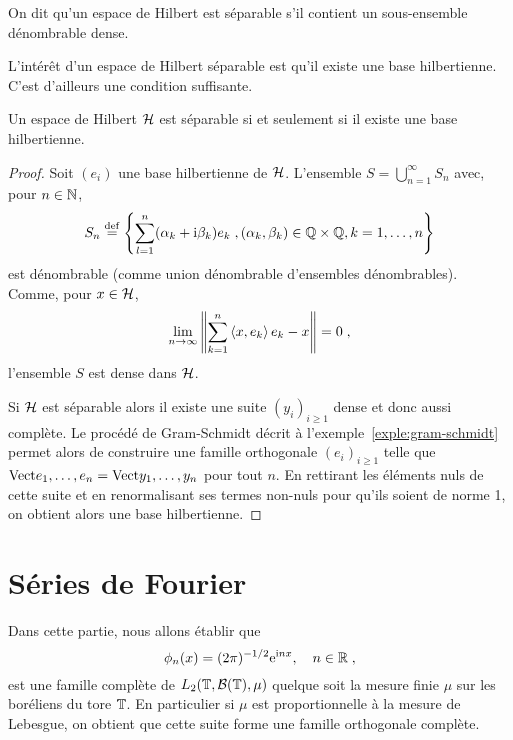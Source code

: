 \begin{definition}
  On dit qu'un espace de Hilbert est s\'{e}parable s'il contient un sous-ensemble
  d\'{e}nombrable dense.
\end{definition}

L'int\'{e}r\^{e}t d'un espace de Hilbert s\'{e}parable est qu'il existe une base
hilbertienne. C'est d'ailleurs une condition suffisante.

\begin{theorem}
Un espace de Hilbert $\mathcal{H}$ est s\'{e}parable si et seulement si il existe une
base hilbertienne.
\end{theorem}
\begin{proof}\smartqed
Soit $(e_i)$ une base hilbertienne de $\mathcal{H}$.
L'ensemble $S= \bigcup_{n=1}^\infty S_n$ avec, pour $n \in \mathbb{N}$,
\[
S_n \stackrel{\mathrm{def}}{=} \left\{ \sum_{l=1}^n (\alpha_k + \mathrm{i} \beta_k) e_k \;, (\alpha_k,\beta_k) \in \mathbb{Q} \times \mathbb{Q}, k=1,\dots,n  \right\}
\]
est d\'{e}nombrable (comme union d\'{e}nombrable d'ensembles d\'{e}nombrables).
Comme, pour $x \in \mathcal{H}$,
\[
\lim_{n \to \infty} \left\| \sum_{k=1}^n \left\langle x, e_k \right\rangle e_k - x \right\| = 0 \;,
\]
l'ensemble $S$ est dense dans $\mathcal{H}$.

Si $\mathcal{H}$ est s\'{e}parable alors il existe une suite $(y_i)_{i\geq1}$ dense et
donc aussi compl\`{e}te. Le proc\'{e}d\'{e} de Gram-Schmidt d\'{e}crit \`{a}
l'exemple~\ref{exple:gram-schmidt} permet alors de construire une famille
orthogonale $(e_i)_{i\geq1}$ telle que
$\mathrm{Vect}{e_1,\dots,e_n}=\mathrm{Vect}{y_1,\dots,y_n}$ pour tout $n$. En rettirant les
\'{e}l\'{e}ments nuls de cette suite et en renormalisant ses termes non-nuls pour
qu'ils soient de norme 1, on obtient alors une base hilbertienne.

\end{proof}

\section{S\'{e}ries de Fourier}
\label{sec:serie-fourier}

Dans cette partie, nous allons \'{e}tablir que
\begin{equation}
  \label{eq:expo_complex}
\phi_n(x)= (2 \pi)^{-1/2} \mathrm{e}^{\mathrm{i} n x},\quad n \in \mathbb{R}\;,
\end{equation}
est une famille
compl\`{e}te de $L_2(\mathbb{T},\mathcal{B}(\mathbb{T}),\mu)$ quelque soit la mesure
finie $\mu$ sur les bor\'{e}liens du tore $\mathbb{T}$.
En particulier si $\mu$ est proportionnelle \`{a} la mesure de Lebesgue, on obtient
que cette suite forme une famille
orthogonale compl\`{e}te.

